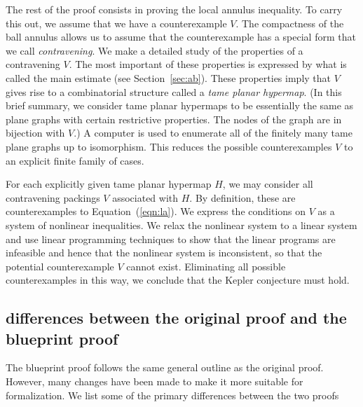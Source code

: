 The rest of the proof consists in proving the local annulus
inequality.  To carry this out, we assume that we have a
counterexample $V$.  The compactness of the ball annulus allows us to
assume that the counterexample has a special form that we call {\it
  contravening}.  We make a detailed study of the properties of a
contravening $V$.  The most important of these properties is expressed
by what is called the main estimate (see Section~\ref{sec:ab}).  These
properties imply that $V$ gives rise to a combinatorial structure
called a {\it tame planar hypermap}.  (In this brief summary, we
consider tame planar hypermaps to be essentially the same as plane
graphs with certain restrictive properties.  The nodes of the graph
are in bijection with $V$.)  A computer is used to enumerate all of
the finitely many tame plane graphs up to isomorphism.  This reduces
the possible counterexamples $V$ to an explicit finite family of
cases.

For each explicitly given tame planar hypermap $H$, we may consider
all contravening packings $V$ associated with $H$.  By definition,
these are counterexamples to Equation~(\ref{eqn:la}).  We express the
conditions on $V$ as a system of nonlinear inequalities.  We relax the
nonlinear system to a linear system and use linear programming
techniques to show that the linear programs are infeasible and hence
that the nonlinear system is inconsistent, so that the potential
counterexample $V$ cannot exist.  Eliminating all possible
counterexamples in this way, we conclude that the Kepler conjecture
must hold.

\subsection{differences between the original proof and the blueprint
  proof}

The blueprint proof follows the same general outline as the original
proof.  However, many changes have been made to make it more suitable
for formalization.  We list some of the primary differences between
the two proofs

